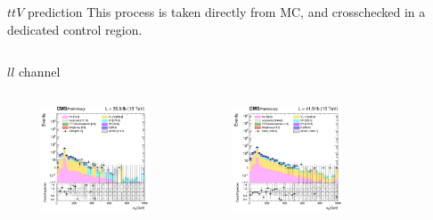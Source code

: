 \documentclass[8pt]{beamer}
\begin{document}
\begin{frame}{$ttV$ prediction}
\justifying
This process is taken directly from MC, and crosschecked in a dedicated control region. \vfill
\begin{columns}
\begin{column}{1.09\textwidth}
\begin{block}{\centering $ll$ channel}\end{block}
\end{column}
\end{columns} \vspace{-5pt}
\begin{columns}
		\begin{column}{0.33\textwidth}
			\begin{center}
			\vspace{-8pt}
			\begin{block}{}\end{block}\vspace{10pt}
     			\includegraphics[width=1.0\textwidth, height=90pt]{figs/2016/log_cratio_ttVCR_ll_mll.png}
    		\end{center}		
		\end{column} 
		\begin{column}{0.33\textwidth}
			\begin{center}
			\vspace{-8pt}
			\begin{block}{}\end{block}\vspace{10pt}
     			\includegraphics[width=1.0\textwidth, height=90pt]{figs/2017/log_cratio_ttVCR_ll_mll.png}
    		\end{center}		
		\end{column} 
		\begin{column}{0.33\textwidth}
			\begin{center}

\end{center}
\end{column}
\end{columns}
\end{frame}
\end{document}
